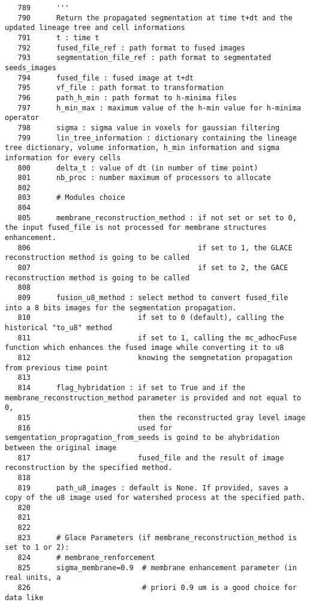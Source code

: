 \documentclass{article}
\begin{document}
\begin{verbatim}
   789	    '''
   790	    Return the propagated segmentation at time t+dt and the updated lineage tree and cell informations
   791	    t : time t
   792	    fused_file_ref : path format to fused images
   793	    segmentation_file_ref : path format to segmentated seeds_images
   794	    fused_file : fused image at t+dt
   795	    vf_file : path format to transformation
   796	    path_h_min : path format to h-minima files
   797	    h_min_max : maximum value of the h-min value for h-minima operator
   798	    sigma : sigma value in voxels for gaussian filtering
   799	    lin_tree_information : dictionary containing the lineage tree dictionary, volume information, h_min information and sigma information for every cells
   800	    delta_t : value of dt (in number of time point)
   801	    nb_proc : number maximum of processors to allocate
   802	
   803	    # Modules choice
   804	
   805	    membrane_reconstruction_method : if not set or set to 0, the input fused_file is not processed for membrane structures enhancement.
   806	                                     if set to 1, the GLACE reconstruction method is going to be called
   807	                                     if set to 2, the GACE reconstruction method is going to be called
   808	
   809	    fusion_u8_method : select method to convert fused_file into a 8 bits images for the segmentation propagation. 
   810	                       if set to 0 (default), calling the historical "to_u8" method
   811	                       if set to 1, calling the mc_adhocFuse function which enhances the fused image while converting it to u8 
   812	                       knowing the semgnetation propagation from previous time point
   813	
   814	    flag_hybridation : if set to True and if the membrane_reconstruction_method parameter is provided and not equal to 0, 
   815	                       then the reconstructed gray level image
   816	                       used for semgentation_propragation_from_seeds is goind to be ahybridation between the original image
   817	                       fused_file and the result of image reconstruction by the specified method.
   818	    
   819	    path_u8_images : default is None. If provided, saves a copy of the u8 image used for watershed process at the specified path.
   820	
   821	
   822	
   823	    # Glace Parameters (if membrane_reconstruction_method is set to 1 or 2):
   824	    # membrane_renforcement
   825	    sigma_membrane=0.9  # membrane enhancement parameter (in real units, a
   826	                        # priori 0.9 um is a good choice for data like 

\end{verbatim}
\end{document}
